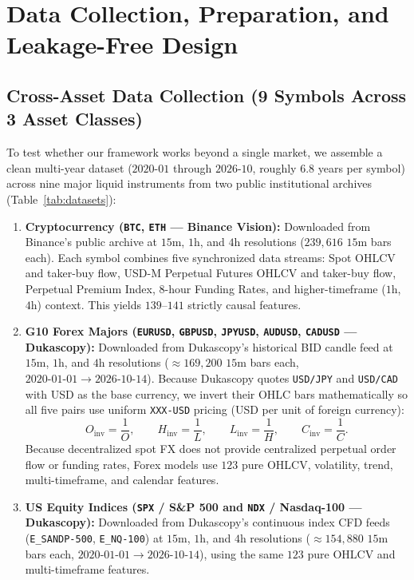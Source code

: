 \documentclass{article}
\begin{document}
\section{Data Collection, Preparation, and Leakage-Free Design}
\label{sec:data}

\subsection{Cross-Asset Data Collection (9 Symbols Across 3 Asset Classes)}

To test whether our framework works beyond a single market, we assemble a clean multi-year dataset ($2020\text{-}01$ through $2026\text{-}10$, roughly $6.8$ years per symbol) across nine major liquid instruments from two public institutional archives (Table~\ref{tab:datasets}):

\begin{enumerate}
    \item \textbf{Cryptocurrency (\texttt{BTC}, \texttt{ETH} — Binance Vision):} Downloaded from Binance's public archive at $15\text{m}$, $1\text{h}$, and $4\text{h}$ resolutions ($239{,}616$ $15\text{m}$ bars each). Each symbol combines five synchronized data streams: Spot OHLCV and taker-buy flow, USD-M Perpetual Futures OHLCV and taker-buy flow, Perpetual Premium Index, $8$-hour Funding Rates, and higher-timeframe ($1\text{h}$, $4\text{h}$) context. This yields $139$--$141$ strictly causal features.
    \item \textbf{G10 Forex Majors (\texttt{EURUSD}, \texttt{GBPUSD}, \texttt{JPYUSD}, \texttt{AUDUSD}, \texttt{CADUSD} — Dukascopy):} Downloaded from Dukascopy's historical BID candle feed at $15\text{m}$, $1\text{h}$, and $4\text{h}$ resolutions ($\approx 169{,}200$ $15\text{m}$ bars each, $2020\text{-}01\text{-}01 \to 2026\text{-}10\text{-}14$). Because Dukascopy quotes \texttt{USD/JPY} and \texttt{USD/CAD} with USD as the base currency, we invert their OHLC bars mathematically so all five pairs use uniform \texttt{XXX-USD} pricing (USD per unit of foreign currency):
    \begin{equation}
      O_{\mathrm{inv}} = \frac{1}{O}, \qquad
      H_{\mathrm{inv}} = \frac{1}{L}, \qquad
      L_{\mathrm{inv}} = \frac{1}{H}, \qquad
      C_{\mathrm{inv}} = \frac{1}{C}.
      \label{eq:invert_ohlc}
    \end{equation}
    Because decentralized spot FX does not provide centralized perpetual order flow or funding rates, Forex models use $123$ pure OHLCV, volatility, trend, multi-timeframe, and calendar features.
    \item \textbf{US Equity Indices (\texttt{SPX} / S\&P 500 and \texttt{NDX} / Nasdaq-100 — Dukascopy):} Downloaded from Dukascopy's continuous index CFD feeds (\texttt{E\_SANDP-500}, \texttt{E\_NQ-100}) at $15\text{m}$, $1\text{h}$, and $4\text{h}$ resolutions ($\approx 154{,}880$ $15\text{m}$ bars each, $2020\text{-}01\text{-}01 \to 2026\text{-}10\text{-}14$), using the same $123$ pure OHLCV and multi-timeframe features.
\end{enumerate}
\end{document}

